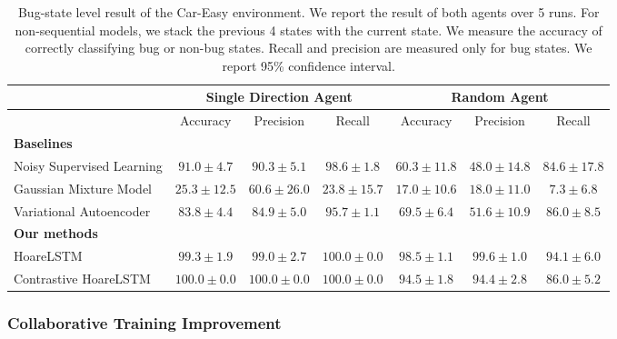 \documentclass{article}
\newcommand{\EDIT}[1]{#1}%
\begin{document}
\begin{table}[t]
\footnotesize
\centering
\begin{tabular}{@{}lcccccc@{}}
\toprule
                      & \multicolumn{3}{c}{Single Direction Agent} & \multicolumn{3}{c}{Random Agent} \\ \midrule
                      & Accuracy      &  Precision   & Recall    & Accuracy  & Precision   & Recall   \\ \midrule
\textbf{Baselines} \\
Noisy Supervised Learning & $91.0 \pm 4.7$          & $90.3 \pm 5.1$          & $98.6 \pm 1.8$       & $60.3 \pm 11.8$      & $48.0 \pm 14.8$       & $84.6 \pm 17.8$    \\
Gaussian Mixture Model    & $25.3 \pm 12.5$          &     $60.6 \pm 26.0$     & $23.8 \pm 15.7$    & $17.0 \pm 10.6$       & $18.0 \pm 11.0$
       & $7.3 \pm 6.8$    \\
Variational Autoencoder   & $83.8 \pm 4.4$ & $84.9 \pm 5.0$     & $95.7 \pm 1.1$      & $69.5 \pm 6.4$      & $51.6 \pm 10.9$       & $86.0 \pm 8.5$     \\ \midrule
\textbf{Our methods} \\
HoareLSTM                 & $99.3 \pm 1.9$         & $99.0 \pm 2.7$         & $100.0 \pm 0.0$      & $98.5 \pm 1.1$      & $99.6 \pm 1.0$      & $94.1 \pm 6.0$ \\
Contrastive HoareLSTM     & $100.0 \pm 0.0$         & $100.0 \pm 0.0$         & $100.0 \pm 0.0$      & $94.5 \pm 1.8$     & $94.4 \pm 2.8$      &  $86.0 \pm 5.2$   \\ \bottomrule
\end{tabular}
\vspace{0.3cm}
\caption{Bug-state level result of the Car-Easy environment. We report the result of both agents over 5 runs. For non-sequential models, we stack the previous 4 states with the current state. We measure the accuracy of correctly classifying bug or non-bug states. Recall and precision are measured only for bug states. We report 95\% confidence interval.}
\label{tab:car_easy}
\end{table}



\subsubsection{\EDIT{Collaborative Training Improvement}}
\label{sec:iterative-training}
\vspace{-2mm}
\end{document}
